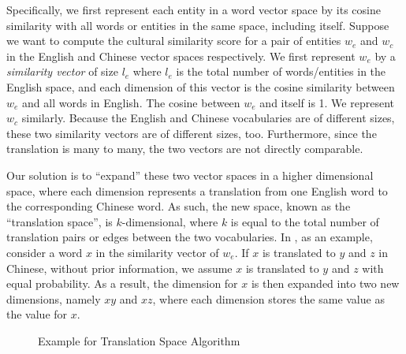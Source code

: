 Specifically, %
we first represent each entity in a word vector space
by its cosine similarity with all words or entities in the
same space, including itself.
Suppose we want to compute the cultural similarity score for a pair of
entities $w_e$ and $w_c$ in the English and Chinese vector spaces respectively.
We first represent $w_e$ by a
{\em similarity vector} of size $l_e$ where $l_e$ is the total number of
words/entities in the English space, and each dimension of this
vector is the cosine similarity between $w_e$ and all words in English.
The cosine between $w_e$ and itself is 1.
We represent $w_c$ similarly. Because the English and Chinese vocabularies
are of different sizes, these two similarity vectors are of different sizes,
too. Furthermore, since the translation is many to many,
the two vectors are not directly comparable.

Our solution is to ``expand'' these two vector spaces in a higher dimensional space,
where each dimension represents a translation from one English word
to the corresponding Chinese word. As such, the new space, known as the
``translation space'', is $k$-dimensional, where $k$ is equal to the total
number of translation pairs or edges between the two vocabularies.
In , as an example,
consider a word $x$ in the similarity
vector of $w_e$. If $x$ is translated to $y$ and $z$ in Chinese,
without prior information, we assume $x$ is translated to $y$ and $z$ with
equal probability. As a result, the dimension for $x$ is then
expanded into two new dimensions,
namely $xy$ and $xz$, where each dimension stores the same value
as the value for $x$.

\begin{figure}[th]
\centering
{}
\caption{Example for Translation Space Algorithm}
\label{fig:transspace}
\end{figure}

